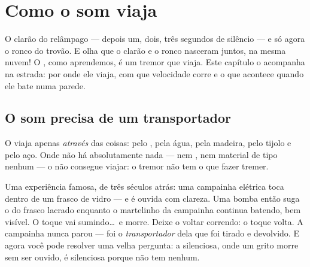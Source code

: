 \chapter{Como o som viaja}\label{ch:g4:how-sound-travels}

O clarão do relâmpago --- depois um, dois, três segundos de silêncio
--- e só agora o ronco do trovão. E olha que o clarão e o ronco
nasceram juntos, na mesma nuvem! O , como aprendemos, é um tremor
que viaja. Este capítulo o acompanha na estrada: por onde ele viaja,
com que velocidade corre e o que acontece quando ele bate numa
parede.

\section{O som precisa de um transportador}

\begin{proposition}\label{prop:g4:how-sound-travels:carrier}
O  viaja apenas \emph{através} das coisas: pelo , pela água,
pela madeira, pelo tijolo e pelo aço. Onde não há absolutamente nada
--- nem , nem material de tipo nenhum --- o  não consegue
viajar: o tremor não tem o que fazer tremer.
\end{proposition}

\begin{example}\label{ex:g4:how-sound-travels:jar}
Uma experiência famosa, de três séculos atrás: uma campainha elétrica
toca dentro de um frasco de vidro --- e é ouvida com clareza. Uma
bomba então suga o  do frasco lacrado enquanto o martelinho da
campainha continua batendo, bem visível. O toque vai sumindo\dots\ e
morre. Deixe o  voltar correndo: o toque volta. A campainha nunca
parou --- foi o \emph{transportador} dela que foi tirado e devolvido.
E agora você pode resolver uma velha pergunta: a  silenciosa, onde
um grito morre sem ser ouvido, é silenciosa porque não tem  nenhum.
\end{example}

